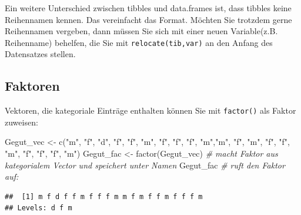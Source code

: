 \documentclass[
]{book}
\newenvironment{Shaded}{\begin{snugshade}}{\end{snugshade}}
\newcommand{\CommentTok}[1]{\textcolor[rgb]{0.56,0.35,0.01}{\textit{#1}}}
\newcommand{\ConstantTok}[1]{\textcolor[rgb]{0.00,0.00,0.00}{#1}}
\newcommand{\FunctionTok}[1]{\textcolor[rgb]{0.00,0.00,0.00}{#1}}
\newcommand{\NormalTok}[1]{#1}
\newcommand{\OtherTok}[1]{\textcolor[rgb]{0.56,0.35,0.01}{#1}}
\newcommand{\SpecialCharTok}[1]{\textcolor[rgb]{0.00,0.00,0.00}{#1}}
\newcommand{\StringTok}[1]{\textcolor[rgb]{0.31,0.60,0.02}{#1}}
\theoremstyle{definition}
\theoremstyle{definition}
\theoremstyle{definition}
\theoremstyle{definition}
\theoremstyle{remark}
\begin{document}
\begin{Shaded}
\end{Shaded}

Ein weitere Unterschied zwischen tibbles und data.frames ist, dass tibbles keine Reihennamen kennen. Das vereinfacht das Format. Möchten Sie trotzdem gerne Reihennamen vergeben, dann müssen Sie sich mit einer neuen Variable(z.B. Reihenname) behelfen, die Sie mit \texttt{relocate(tib,var)} an den Anfang des Datensatzes stellen.

\hypertarget{faktoren}{%
\subsection{Faktoren}\label{faktoren}}

Vektoren, die kategoriale Einträge enthalten können Sie mit \texttt{factor()} als Faktor zuweisen:

\begin{Shaded}
\begin{Highlighting}[]
\NormalTok{Gegut\_vec }\OtherTok{\textless{}{-}} \FunctionTok{c}\NormalTok{(}\StringTok{"m"}\NormalTok{, }\StringTok{"f"}\NormalTok{, }\StringTok{"d"}\NormalTok{, }\StringTok{"f"}\NormalTok{, }\StringTok{"f"}\NormalTok{, }\StringTok{"m"}\NormalTok{, }\StringTok{"f"}\NormalTok{, }\StringTok{"f"}\NormalTok{, }\StringTok{"f"}\NormalTok{, }\StringTok{"m"}\NormalTok{,}\StringTok{"m"}\NormalTok{, }\StringTok{"f"}\NormalTok{, }\StringTok{"m"}\NormalTok{, }\StringTok{"f"}\NormalTok{, }\StringTok{"f"}\NormalTok{, }\StringTok{"m"}\NormalTok{, }\StringTok{"f"}\NormalTok{, }\StringTok{"f"}\NormalTok{, }\StringTok{"f"}\NormalTok{, }\StringTok{"m"}\NormalTok{) }
\NormalTok{Gegut\_fac }\OtherTok{\textless{}{-}} \FunctionTok{factor}\NormalTok{(Gegut\_vec)                 }\CommentTok{\# macht Faktor aus kategorialem Vector und speichert unter Namen}
\NormalTok{Gegut\_fac                                      }\CommentTok{\# ruft den Faktor auf:}
\end{Highlighting}
\end{Shaded}

\begin{verbatim}
##  [1] m f d f f m f f f m m f m f f m f f f m
## Levels: d f m
\end{verbatim}
\end{document}
